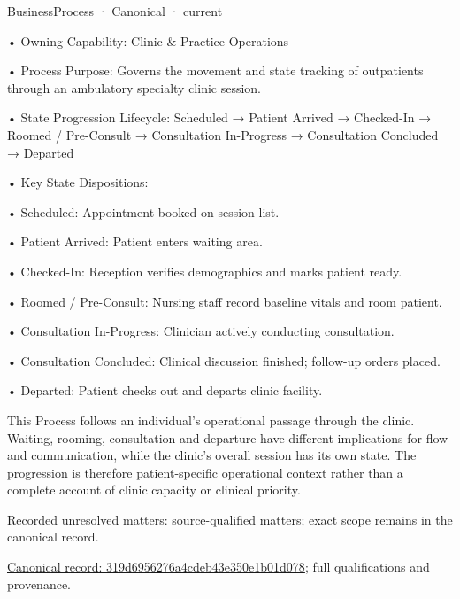 \label{element:319d6956276a4cdeb43e350e1b01d078}
{\small BusinessProcess · Canonical · current}\par

•
Owning Capability: Clinic \& Practice Operations



•
Process Purpose: Governs the movement and state tracking of outpatients through an ambulatory specialty clinic session.



•
State Progression Lifecycle: Scheduled → Patient Arrived → Checked-In → Roomed / Pre-Consult → Consultation In-Progress → Consultation Concluded → Departed



•
Key State Dispositions:



•
Scheduled: Appointment booked on session list.



•
Patient Arrived: Patient enters waiting area.



•
Checked-In: Reception verifies demographics and marks patient ready.



•
Roomed / Pre-Consult: Nursing staff record baseline vitals and room patient.



•
Consultation In-Progress: Clinician actively conducting consultation.



•
Consultation Concluded: Clinical discussion finished; follow-up orders placed.



•
Departed: Patient checks out and departs clinic facility.



This Process follows an individual's operational passage through the clinic. Waiting, rooming, consultation and departure have different implications for flow and communication, while the clinic's overall session has its own state. The progression is therefore patient-specific operational context rather than a complete account of clinic capacity or clinical priority.


{\small Recorded unresolved matters: source-qualified matters; exact scope remains in the canonical record.}\par
{\footnotesize \href{../../../../continuum/business/business-process/319d6956276a4cdeb43e350e1b01d078.md}{Canonical record: 319d6956276a4cdeb43e350e1b01d078}; full qualifications and provenance.}\par
